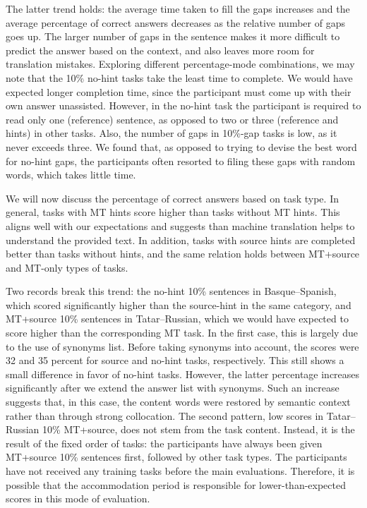 \documentclass[11pt]{article}
\newcommand{\comment}[1]{\marginpar{\scriptsize\sf \textcolor{blue}{#1}}}
\begin{document}
The latter trend holds: the average time taken to fill the gaps increases and the average percentage of correct answers decreases as the relative number of gaps goes up. The larger number of gaps in the sentence makes it more
difficult to predict the answer based on the context, and also leaves more room for
translation mistakes. Exploring different percentage-mode combinations, we may note that the 10\% no-hint tasks take the least time to complete. We would have expected longer completion time, since the participant must come up with their own answer unassisted. However, in the no-hint task the participant is required to read only one (reference) sentence, as opposed to two or three (reference and hints) in other tasks. Also, the number of gaps in 10\%-gap tasks is low, as it never exceeds three. We found that, as opposed to trying to devise the best word for no-hint gaps, the participants often resorted to filing these gaps with random words, which takes little time.
\comment{EA: anything else I could write about times?}

We will now discuss the percentage of correct answers based on task type. In general, tasks with MT hints score higher than tasks without MT hints. This aligns well with our expectations and suggests than machine translation helps to understand the provided text. In addition, tasks with source hints are completed better than tasks without hints, and the same relation holds between MT+source and MT-only types of tasks. 

Two records break this trend: the no-hint 10\% sentences in Basque--Spanish, which scored significantly higher than the source-hint in the same category, and MT+source 10\% sentences in Tatar--Russian, which we would have expected to score higher than the corresponding MT task. In the first case, this is largely due to the use of synonyms list. Before taking synonyms into account, the scores were 32 and 35 percent for source and no-hint tasks, respectively. This still shows a small difference in favor of no-hint tasks. However, the latter percentage increases significantly after we extend the answer list with synonyms. Such an increase suggests that, in this case, the content words were restored by 
\comment{EA: to JA: I am not sure if this qualifies as common sense. What I meant is that people correctly guessed the meaning of the word in place, and expressed it in their own manner. Changed it to semantic context, is this a better rephrasing?}
semantic context rather than through strong collocation. The second pattern, low scores in Tatar--Russian 10\% MT+source, does not stem from the task content. Instead, it is the result of the fixed order of tasks: the participants have always been given MT+source 10\% sentences first, followed by other task types. The participants have not received any training tasks before the main evaluations. Therefore, it is possible that the accommodation period is responsible for lower-than-expected scores in this mode of evaluation. 
\end{document}
